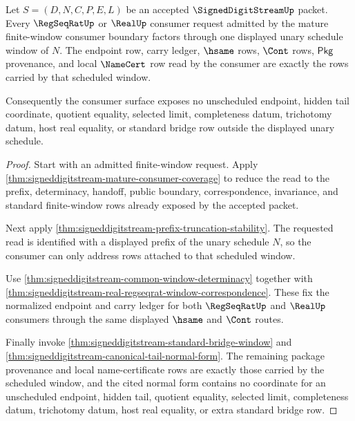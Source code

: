 \begin{theorem}
\label{thm:signeddigitstream-scheduled-window-exhaustion}
Let $S=(D,N,C,P,E,L)$ be an accepted $\SignedDigitStreamUp$ packet. Every
$\RegSeqRatUp$ or $\RealUp$ consumer request admitted by the mature
finite-window consumer boundary factors through one displayed unary schedule
window of $N$. The endpoint row, carry ledger, $\hsame$ rows, $\Cont$ rows,
$\mathsf{Pkg}$ provenance, and local $\NameCert$ row read by the consumer are
exactly the rows carried by that scheduled window.

Consequently the consumer surface exposes no unscheduled endpoint, hidden tail
coordinate, quotient equality, selected limit, completeness datum, trichotomy
datum, host real equality, or standard bridge row outside the displayed unary
schedule.
\end{theorem}
\begin{proof}
Start with an admitted finite-window request. Apply
\autoref{thm:signeddigitstream-mature-consumer-coverage} to reduce the read to
the prefix, determinacy, handoff, public boundary, correspondence, invariance,
and standard finite-window rows already exposed by the accepted packet.

Next apply \autoref{thm:signeddigitstream-prefix-truncation-stability}. The
requested read is identified with a displayed prefix of the unary schedule
$N$, so the consumer can only address rows attached to that scheduled window.

Use \autoref{thm:signeddigitstream-common-window-determinacy} together with
\autoref{thm:signeddigitstream-real-regseqrat-window-correspondence}. These
fix the normalized endpoint and carry ledger for both $\RegSeqRatUp$ and
$\RealUp$ consumers through the same displayed $\hsame$ and $\Cont$ routes.

Finally invoke \autoref{thm:signeddigitstream-standard-bridge-window} and
\autoref{thm:signeddigitstream-canonical-tail-normal-form}. The remaining
package provenance and local name-certificate rows are exactly those carried by
the scheduled window, and the cited normal form contains no coordinate for an
unscheduled endpoint, hidden tail, quotient equality, selected limit,
completeness datum, trichotomy datum, host real equality, or extra standard
bridge row.
\end{proof}


